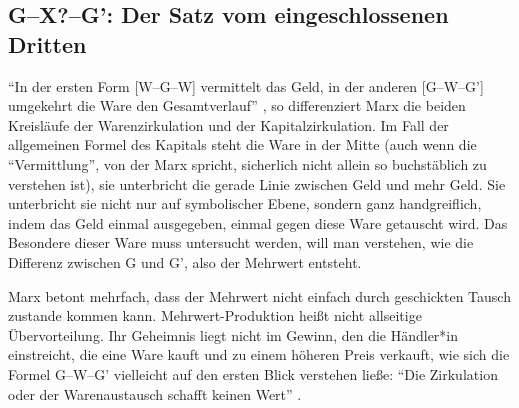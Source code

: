 \documentclass[12pt,
               paper=a4,
               twoside=false,
               onehalfspacing,
               bibliography=totoc,
               toc=graduated,
               ]{scrartcl}
\newcommand{\pc}[2]{\parencite[#1]{#2}}
\newcommand{\worries}[1]{\ifdraft{\textcolor{blue}{\texttt{(#1)}}}{}}
\newcommand{\gwg}{G--W--G'\xspace}
\newcommand{\cic}{Connect -- I -- cut\xspace}
\begin{document}





\subsection{G--X?--G': Der Satz vom eingeschlossenen Dritten}




"`In der ersten Form [W--G--W] vermittelt das Geld, in der anderen
[G--W--G'] umgekehrt die Ware den Gesamtverlauf"' \pc{163}{kap}, so
differenziert Marx die beiden Kreisläufe der Warenzirkulation und der
Kapitalzirkulation. Im Fall der allgemeinen Formel des Kapitals steht
die Ware in der Mitte (auch wenn die "`Vermittlung"', von der Marx
spricht, sicherlich nicht allein so buchstäblich zu verstehen ist), sie
unterbricht die gerade Linie zwischen Geld und mehr Geld. Sie
unterbricht sie nicht nur auf symbolischer Ebene, sondern ganz
handgreiflich, indem das Geld einmal ausgegeben, einmal gegen diese
Ware getauscht wird. Das Besondere dieser Ware muss untersucht werden,
will man verstehen, wie die Differenz zwischen G und G', also der
Mehrwert entsteht.


Marx betont mehrfach, dass der Mehrwert nicht einfach durch
geschickten Tausch zustande kommen kann. Mehrwert-Produktion heißt
nicht allseitige Übervorteilung. Ihr Geheimnis liegt nicht im Gewinn,
den die Händler*in einstreicht, die eine Ware kauft und zu einem
höheren Preis verkauft, wie sich die Formel \gwg vielleicht auf den
ersten Blick verstehen ließe: "`Die Zirkulation oder der
Warenaustausch schafft keinen Wert"' \pc{178}{kap}.
\end{document}
